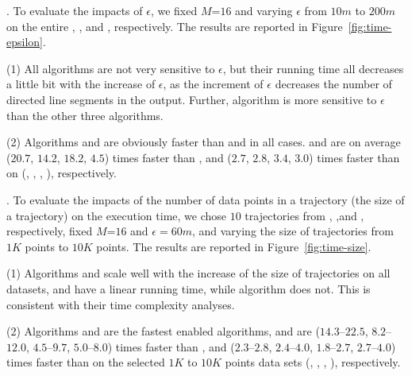 


.
To evaluate the impacts of $\epsilon$, we fixed \textcolor[rgb]{0.00,0.07,1.00}{$M$=$16$} and varying $\epsilon$  from $10m$ to $200m$ on the entire \truck, \sercar, \geolife and \pricar, respectively.
The results are reported in Figure~\ref{fig:time-epsilon}.

\ni(1) All algorithms are not very sensitive to $\epsilon$, but their running time all decreases a little bit with the increase of $\epsilon$, as the increment of $\epsilon$ decreases the number of directed line segments in the output.
Further, algorithm \dps is more sensitive to $\epsilon$ than the other three algorithms.

\ni\textcolor[rgb]{0.00,0.07,1.00}{{(2)}} Algorithms \cist and \cista are obviously faster than \dps and \squishe in all cases.
\cist and \cista are on average ($20.7$, $14.2$, $18.2$, \textcolor[rgb]{1.00,0.50,0.25}{{$4.5$}}) times faster than \dps, and ($2.7$, $2.8$, $3.4$, {$3.0$}) times faster than \squishe on (\truck, \sercar, {\geolife}, \pricar), respectively.


.
To evaluate the impacts of the number of data points in a trajectory (\ie the size of a trajectory) on the execution time,
we chose {$10$} trajectories from \truck, \sercar,\geolife and \pricar, respectively,
fixed \textcolor[rgb]{0.00,0.07,1.00}{$M$=$16$} and $\epsilon = 60m$, and varying the size  of trajectories from $1K$ points to $10K$ points.
%
The results are reported in Figure~\ref{fig:time-size}.

\ni(1) Algorithms \cist and \cista scale well with the increase of the size of trajectories on all datasets,
and have a linear running time, while algorithm \dps does not.
This is consistent with their time complexity analyses.

\ni\textcolor[rgb]{1.00,0.00,0.00}{(2)} Algorithms \cist and \cista are the fastest \sed enabled \lsa algorithms, and are {($14.3$--$22.5$, $8.2$--$12.0$, $4.5$--$9.7$, $5.0$--$8.0$)} times faster than \dps,
and {($2.3$--$2.8$, $2.4$--$4.0$, $1.8$--$2.7$, $2.7$--$4.0$)} times faster than \squishe on the selected $1K$ to $10K$ points data sets (\truck, \sercar, \geolife, \pricar), respectively.

